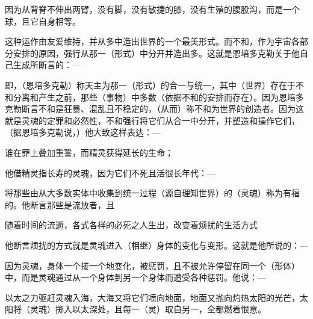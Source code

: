 因为从背脊不伸出两臂，\newline{}没有脚，没有敏捷的膝，没有生殖的腹股沟，\newline{}而是一个球，且它自身相等。\par

这种运作由友爱维持，并从多中造出世界的一个最美形式。而不和，作为宇宙各部分安排的原因，强行从那一（形式）中分开并造出多。这就是恩培多克勒关于他自己生成所断言的：—\par

\par

即，（恩培多克勒）称天主为那一（形式）的合一与统一，其中（世界）存在于不和分离和产生之前，那些（事物）中多数（依据不和的安排而存在）。因为恩培多克勒断言不和是狂暴、混乱且不稳定的，（从而）称不和为世界的创造者。因为这就是灵魂的定罪和必然性，不和强行将它们从合一中分开，并塑造和操作它们，（据恩培多克勒说，）他大致这样表达：—\par

谁在罪上叠加重誓，\newline{}而精灵获得延长的生命；\par

他借精灵指长寿的灵魂，因为它们不死且活很长年代：—\par

\par

将那些由从大多数实体中收集到统一过程（源自理知世界）的（灵魂）称为有福的。他断言那些是流放者，且\par

随着时间的流逝，各式各样的必死之人生出，\newline{}改变着烦扰的生活方式\newline{}\par

他断言烦扰的方式就是灵魂进入（相继）身体的变化与变形。这就是他所说的：—\par

\par

因为灵魂，身体一个接一个地变化，被惩罚，且不被允许停留在同一个（形体）中，而是灵魂通过从一个身体到另一个身体而遭受各种惩罚。他说：—\par

以太之力驱赶灵魂入海，\newline{}大海又将它们喷向地面，\newline{}地面又抛向灼热太阳的光芒，太阳将（灵魂）\newline{}掷入以太深处，且每一（灵）\newline{}取自另一，全都燃着恨意。\newline{}\par

